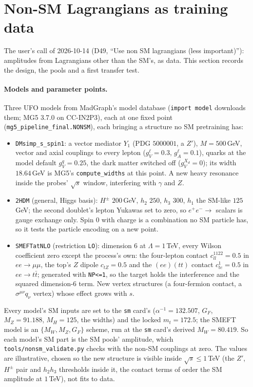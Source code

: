 \documentclass[11pt]{article}
\newcommand{\code}[1]{\texttt{#1}}
\begin{document}
\section{Non-SM Lagrangians as training data}\label{sec:nonsm}
The user's call of 2026-10-14 (D49, ``Use non SM lagrangians (less important)''): amplitudes from Lagrangians other than
the SM's, as data. This section records the design, the pools and a first transfer test.

\paragraph{Models and parameter points.} Three UFO models from MadGraph's model database (\code{import model} downloads
them; MG5 3.7.0 on CC-IN2P3), each at one fixed point (\code{mg5\_pipeline\_final.NONSM}), each bringing a structure
no SM pretraining has:
\begin{itemize}
  \item \code{DMsimp\_s\_spin1}: a vector mediator $Y_1$ (PDG $5000001$, a $Z'$), $M=500$\,GeV, vector and axial couplings to every lepton
    ($g_V^\ell=0.3$, $g_A^\ell=0.1$), quarks at the model default $g_V^q=0.25$, the dark matter switched off ($g_V^{X_d}=0$);
    its width $18.64$\,GeV is MG5's \code{compute\_widths} at this point. A new heavy resonance inside the probes' $\sqrt s$
    window, interfering with $\gamma$ and $Z$.
  \item \code{2HDM} (general, Higgs basis): $H^\pm$ $200$\,GeV, $h_2$ $250$, $h_3$ $300$, $h_1$ the SM-like $125$\,GeV;
    the second doublet's lepton Yukawas set to zero, so $e^+e^-\to$ scalars is gauge exchange only. Spin $0$ with charge
    is a combination no SM particle has, so it tests the particle encoding on a new point.
  \item \code{SMEFTatNLO} (restriction \code{LO}): dimension $6$ at $\Lambda=1$\,TeV, every Wilson coefficient zero except
    the process's own: the four-lepton contact $c_{ll}^{1122}=0.5$ in $ee\to\mu\mu$, the top's $Z$ dipole $c_{tZ}=0.5$
    and the $(ee)(tt)$ contact $c_{te}^{1}=0.5$ in $ee\to t\bar t$; generated with \code{NP<=1}, so the target holds
    the interference and the squared dimension-6 term. New vertex structures (a four-fermion contact, a
    $\sigma^{\mu\nu}q_\nu$ vertex) whose effect grows with $s$.
\end{itemize}
Every model's SM inputs are set to the \code{sm} card's ($\alpha^{-1}=132.507$, $G_F$, $M_Z=91.188$, $M_H=125$, the
widths) and the locked $m_t=172.5$; the SMEFT model is an $\{M_W, M_Z, G_F\}$ scheme, run at the \code{sm} card's derived
$M_W=80.419$. So each model's SM part is the SM pools' amplitude, which \code{tools/nonsm\_validate.py} checks with the
non-SM couplings at zero. The values are illustrative, chosen so the new structure is visible inside $\sqrt s\le1$\,TeV
(the $Z'$, $H^\pm$ pair and $h_2h_3$ thresholds inside it, the contact terms of order the SM amplitude at $1$\,TeV), not
fits to data.
\end{document}
